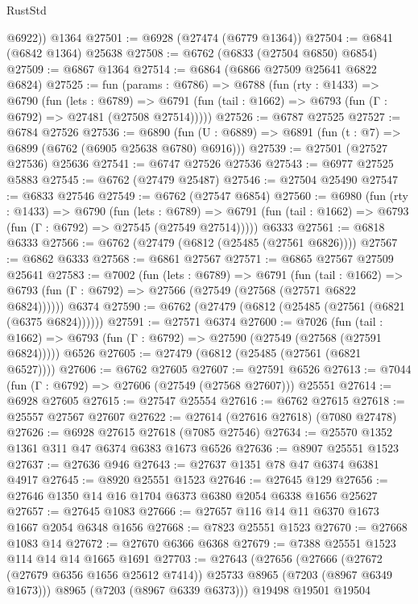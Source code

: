 \begin{lexlean}{RustStd}
\begin{coremodule}
        @6922))
    @1364
@27501 := @6928 (@27474 (@6779 @1364))
@27504 := @6841 (@6842 @1364) @25638
@27508 := @6762 (@6833 (@27504 @6850) @6854)
@27509 := @6867 @1364
@27514 := @6864 (@6866 @27509 @25641 @6822 @6824)
@27525 := fun (params : @6786) =>
  @6788
    (fun (rty : @1433) =>
    @6790
      (fun (lets : @6789) =>
      @6791 (fun (tail : @1662) => @6793 (fun (Γ : @6792) => @27481 (@27508 @27514)))))
@27526 := @6787 @27525
@27527 := @6784 @27526
@27536 := @6890
    (fun (U : @6889) => @6891 (fun (t : @7) => @6899 (@6762 (@6905 @25638 @6780) @6916)))
@27539 := @27501 (@27527 @27536) @25636
@27541 := @6747 @27526 @27536
@27543 := @6977 @27525 @5883
@27545 := @6762 (@27479 @25487)
@27546 := @27504 @25490
@27547 := @6833 @27546
@27549 := @6762 (@27547 @6854)
@27560 := @6980
    (fun (rty : @1433) =>
    @6790
      (fun (lets : @6789) =>
      @6791 (fun (tail : @1662) => @6793 (fun (Γ : @6792) => @27545 (@27549 @27514)))))
    @6333
@27561 := @6818 @6333
@27566 := @6762 (@27479 (@6812 (@25485 (@27561 @6826))))
@27567 := @6862 @6333
@27568 := @6861 @27567
@27571 := @6865 @27567 @27509 @25641
@27583 := @7002
    (fun (lets : @6789) =>
    @6791
      (fun (tail : @1662) =>
      @6793 (fun (Γ : @6792) => @27566 (@27549 (@27568 (@27571 @6822 @6824))))))
    @6374
@27590 := @6762 (@27479 (@6812 (@25485 (@27561 (@6821 (@6375 @6824))))))
@27591 := @27571 @6374
@27600 := @7026
    (fun (tail : @1662) => @6793 (fun (Γ : @6792) => @27590 (@27549 (@27568 (@27591 @6824)))))
    @6526
@27605 := @27479 (@6812 (@25485 (@27561 (@6821 @6527))))
@27606 := @6762 @27605
@27607 := @27591 @6526
@27613 := @7044 (fun (Γ : @6792) => @27606 (@27549 (@27568 @27607))) @25551
@27614 := @6928 @27605
@27615 := @27547 @25554
@27616 := @6762 @27615
@27618 := @25557 @27567 @27607
@27622 := @27614 (@27616 @27618) (@7080 @27478)
@27626 := @6928 @27615 @27618 (@7085 @27546)
@27634 := @25570 @1352 @1361 @311 @47 @6374 @6383 @1673 @6526
@27636 := @8907 @25551 @1523
@27637 := @27636 @946
@27643 := @27637 @1351 @78 @47 @6374 @6381 @4917
@27645 := @8920 @25551 @1523
@27646 := @27645 @129
@27656 := @27646 @1350 @14 @16 @1704 @6373 @6380 @2054 @6338 @1656 @25627
@27657 := @27645 @1083
@27666 := @27657 @116 @14 @11 @6370 @1673 @1667 @2054 @6348 @1656
@27668 := @7823 @25551 @1523
@27670 := @27668 @1083 @14
@27672 := @27670 @6366 @6368
@27679 := @7388 @25551 @1523 @114 @14 @14 @1665 @1691
@27703 := @27643
    (@27656
      (@27666 (@27672 (@27679 @6356 @1656 @25612 @7414)) @25733 @8965 (@7203 (@8967 @6349 @1673)))
      @8965
      (@7203 (@8967 @6339 @6373)))
    @19498
    @19501
    @19504

\end{coremodule}
\end{lexlean}
